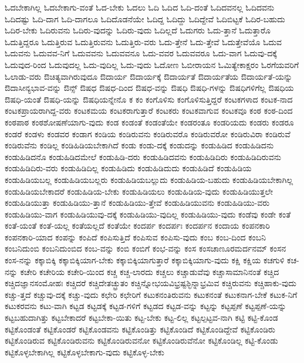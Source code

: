 {ಓದಬೇಕಾಗಿಲ್ಲ
ಓದಬೇಕಾಗು-ವಂತೆ
ಓದ-ಬೇಕು
ಓದಲು
ಓದಿ
ಓದಿದ
ಓದಿ-ದಂತೆ
ಓದಿದವನಲ್ಲ
ಓದಿದವನು
ಓದಿದಷ್ಟು
ಓದಿ-ದಾಗ
ಓದಿ-ದಾಗಲೂ
ಓದಿದೊಡನೆಯೇ
ಓದಿದ್ದ
ಓದಿದ್ದು
ಓದಿದ್ದೇವೆ
ಓದಿಬಿಟ್ಟಕೆ
ಓದಿರ-ಬಹುದು
ಓದಿರ-ಬೇಕು
ಓದಿರುವನು
ಓದಿರು-ವುದನ್ನು
ಓದಿರು-ವುದು
ಓದಿಲ್ಲದೆ
ಓದುಗರು
ಓದು-ತ್ತಾನೆ
ಓದುತ್ತಾರೊ
ಓದುತ್ತಿದ್ದರೂ
ಓದುತ್ತಿರುವ
ಓದುತ್ತಿರುವನು
ಓದುತ್ತಿರು-ವರು
ಓದು-ತ್ತೇನೆ
ಓದು-ತ್ತೇವೆ
ಓದುತ್ತೇವೆಯೊ
ಓದುವ
ಓದುವನು
ಓದುವವ-ನಿಗೆ
ಓದುವವನು
ಓದುವವನೂ
ಓದು-ವವರ
ಓದುವವರೂ
ಓದು-ವಾಗ
ಓದುವು-ದಕ್ಕೆ
ಓದುವುದ-ರಿಂದ
ಓದುವುದಲ್ಲ
ಓದು-ವುದಿಲ್ಲ
ಓದು-ವುದು
ಓದೋಣ
ಓಬೀರಾಯನ
ಓಮಿತ್ಯೇಕಾಕ್ಷರಂ
ಓರಗೆಯವರಿಗೆ
ಓಲಾಡು-ವರು
ಔಚಿತ್ಯವಾಗಿರುವುದೂ
ಔದಾರ್ಯ
ಔದಾರ್ಯಕ್ಕೆ
ಔದಾರ್ಯತೆ
ಔದಾರ್ಯತೆಯ
ಔದಾರ್ಯತೆ-ಯನ್ನು
ಔದಾಸೀನ್ಯಭಾವ-ವನ್ನು
ಔನ್ಸ್
ಔಷಧ
ಔಷಧ-ದಿಂದ
ಔಷಧ-ವನ್ನು
ಔಷಧಿ
ಔಷಧಿ-ಗಳನ್ನು
ಔಷಧಿಗಳಿಗೆಲ್ಲ
ಔಷಧಿಯ
ಔಷಧಿ-ಯಂತೆ
ಔಷಧಿ-ಯನ್ನು
ಔಷಧಿಯನ್ನೇನೊ
ಕ
ಕಂ
ಕಂಗೊಳಿಸು
ಕಂಗೊಳಿಸುತ್ತಿದ್ದರೆ
ಕಂಟಕಗಳಾದ
ಕಂಟಕ-ನಾದ
ಕಂಟಕಪ್ರಾಯರಾಗಿದ್ದ-ವರು
ಕಂಟಕಮಯ
ಕಂಟಕರಾಗುತ್ತಾರೆ
ಕಂಟಕರು
ಕಂಟಕವಾಗುವ
ಕಂಟಕವೂ
ಕಂಠ
ಕಂಠ-ದಿಂದ
ಕಂಠಪಾಠ
ಕಂಠಶೋಷಣೆಯಾಗು-ವುದು
ಕಂಡ
ಕಂಡಂತೆ
ಕಂಡಂತೆಯೇ
ಕಂಡರಂತೂ
ಕಂಡರಿಯದು
ಕಂಡರು
ಕಂಡರೂ
ಕಂಡರೆ
ಕಂಡಳು
ಕಂಡವರ
ಕಂಡಾಗ
ಕಂಡಿಯ
ಕಂಡಿರುವನು
ಕಂಡಿರುವರೊ
ಕಂಡಿರುವರೋ
ಕಂಡಿರುವಿರಾ
ಕಂಡಿರುವೆ
ಕಂಡಿರುವೆನು
ಕಂಡಿಲ್ಲ
ಕಂಡಿಹಿಡಿಯಬೇಕಾಗಿದೆ
ಕಂಡು
ಕಂಡು-ದಕ್ಕೆ
ಕಂಡುದನ್ನು
ಕಂಡುಹಿಡಿದ
ಕಂಡುಹಿಡಿದನು
ಕಂಡುಹಿಡಿದನೊ
ಕಂಡುಹಿಡಿದಮೇಲೆ
ಕಂಡುಹಿಡಿ-ದರು
ಕಂಡುಹಿಡಿದವನು
ಕಂಡುಹಿಡಿದಿರು
ಕಂಡುಹಿಡಿದಿರುವನು
ಕಂಡುಹಿಡಿದಿರು-ವರು
ಕಂಡುಹಿಡಿದಿಲ್ಲ
ಕಂಡುಹಿಡಿದು
ಕಂಡುಹಿಡಿದುದು
ಕಂಡುಹಿಡಿದೆ
ಕಂಡುಹಿಡಿಯ
ಕಂಡುಹಿಡಿಯಬಲ್ಲ
ಕಂಡುಹಿಡಿಯಬಲ್ಲರು
ಕಂಡುಹಿಡಿಯಬಲ್ಲುದು
ಕಂಡುಹಿಡಿಯ-ಬಹುದು
ಕಂಡುಹಿಡಿಯಬೇಕಾಗಿಲ್ಲ
ಕಂಡುಹಿಡಿಯಬೇಕಾದರೆ
ಕಂಡುಹಿಡಿಯ-ಬೇಕು
ಕಂಡುಹಿಡಿಯಲು
ಕಂಡುಹಿಡಿಯ-ವುದು
ಕಂಡುಹಿಡಿಯುತ್ತಲೇ
ಕಂಡುಹಿಡಿಯುತ್ತಾ
ಕಂಡುಹಿಡಿಯು-ತ್ತಾನೆ
ಕಂಡುಹಿಡಿಯು-ತ್ತೇವೆ
ಕಂಡುಹಿಡಿಯುವನು
ಕಂಡುಹಿಡಿಯು-ವರು
ಕಂಡುಹಿಡಿಯು-ವಾಗ
ಕಂಡುಹಿಡಿಯುವು-ದಕ್ಕೆ
ಕಂಡುಹಿಡಿಯು-ವುದಿಲ್ಲ
ಕಂಡುಹಿಡಿಯು-ವುದು
ಕಂಡೆವು
ಕಂಡೇ
ಕಂತೆ
ಕಂತೆ-ಯಂತೆ
ಕಂತೆ-ಯಲ್ಲ
ಕಂತೆಯಲ್ಲದೆ
ಕಂತೆಯೇ
ಕಂದರ್ಪ
ಕಂದರ್ಪಃ
ಕಂದರ್ಪನ
ಕಂದಾಯ
ಕಂಪನಕಾರಿ
ಕಂಪನಕಾರಿ-ಯಾದ
ಕಂಪನ್ನು
ಕಂಪಿದೆ
ಕಂಪಿಸುತ್ತಿದೆ
ಕಂಪಿಸುವ
ಕಂಪಿಸು-ವುದು
ಕಂಬ
ಕಂಬ-ದಿಂದ
ಕಂಬನಿ
ಕಂಬನಿದುಂಬಿ
ಕಂಬನಿದುಂಬಿದ
ಕಂಬ-ವನ್ನು
ಕಂಬಿ
ಕಂಬಿಗೆ
ಕಂಭ-ವನ್ನು
ಕಂಸ
ಕಂಸಚಾಣೂರಮರ್ದನಮ್
ಕಂಸನ
ಕಂಸ-ನನ್ನು
ಕಕ್ಕಾಬಿಕ್ಕಿ
ಕಕ್ಕಾಬಿಕ್ಕಿಯಾಗ-ಬೇಕು
ಕಕ್ಕಾಬಿಕ್ಕಿಯಾಗುತ್ತಾರೆ
ಕಕ್ಕಾಬಿಕ್ಕಿಯಾಗು-ವುದು
ಕಕ್ಷಿ
ಕಕ್ಷಿಯ
ಕಚಗುಳಿ
ಕಚ-ನನ್ನು
ಕಚೇರಿ
ಕಚೇರಿಯ
ಕಚೇರಿ-ಯಿಂದ
ಕಚ್ಚ
ಕಚ್ಚ-ಲಾರದು
ಕಚ್ಚಲು
ಕಚ್ಚಾಡುವೆವು
ಕಚ್ಚಾಸಾಮಾನಿನಂತೆ
ಕಚ್ಚಿದ
ಕಚ್ಚಿದಜ್ಞಾನಸಂಮೋಹಃ
ಕಚ್ಚಿದರೆ
ಕಚ್ಚಿದೇತಚ್ಛ್ರುತಂ
ಕಚ್ಚಿನ್ನೋಭಯವಿಭ್ರಷ್ಟಶ್ಛಿನ್ನಾಭ್ರಮಿವ
ಕಚ್ಚಿರುವನು
ಕಚ್ಚಿಹಾಕು-ವುದು
ಕಚ್ಚು-ತ್ತದೆ
ಕಚ್ಚುವು-ದಕ್ಕೆ
ಕಚ್ಚು-ವುದು
ಕಛೇರಿ
ಕಛೇರಿಗೆ
ಕಟುಕನಂತಿರುವನು
ಕಟುಕನಂತೆ
ಕಟುಕನಾಗ-ಬೇಕೆ
ಕಟುಕ-ನಿಗೆ
ಕಟುಕರವನು
ಕಟು-ವಾಗಿ
ಕಟ್ಟಡ
ಕಟ್ಟಡಕ್ಕೆ
ಕಟ್ಟಡ-ಗಳಿಗೆ
ಕಟ್ಟಡದ
ಕಟ್ಟಡ-ವನ್ನು
ಕಟ್ಟನ್ನು
ಕಟ್ಟಪ್ಪಣೆ
ಕಟ್ಟಪ್ಪಣೆ-ಯನ್ನು
ಕಟ್ಟಬಹುದಾಗಿತ್ತು
ಕಟ್ಟಬೇಕಾದರೆ
ಕಟ್ಟಬೇಕಾ-ಯಿತು
ಕಟ್ಟ-ಬೇಕು
ಕಟ್ಟ-ಲಿಲ್ಲ
ಕಟ್ಟಲ್ಪಟ್ಟವ-ನಾಗಿ
ಕಟ್ಟಿ
ಕಟ್ಟಿ-ಕೊಂಡ
ಕಟ್ಟಿಕೊಂಡಂತೆ
ಕಟ್ಟಿಕೊಂಡರೆ
ಕಟ್ಟಿಕೊಂಡವನು
ಕಟ್ಟಿಕೊಂಡಿತ್ತು
ಕಟ್ಟಿಕೊಂಡಿದೆ
ಕಟ್ಟಿಕೊಂಡಿದ್ದೇವೆ
ಕಟ್ಟಿಕೊಂಡಿರು
ಕಟ್ಟಿಕೊಂಡಿರುವ
ಕಟ್ಟಿಕೊಂಡಿರುವನು
ಕಟ್ಟಿಕೊಂಡಿರುವನೋ
ಕಟ್ಟಿಕೊಂಡಿರುವೆನೋ
ಕಟ್ಟಿಕೊಂಡಿಲ್ಲ
ಕಟ್ಟಿ-ಕೊಂಡು
ಕಟ್ಟಿಕೊಳ್ಳಬೇಕಾಗಿಲ್ಲ
ಕಟ್ಟಿಕೊಳ್ಳಬೇಕಾಗು-ವುದು
ಕಟ್ಟಿಕೊಳ್ಳ-ಬೇಕು
}
